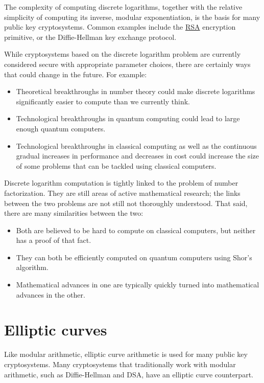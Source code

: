 \documentclass[11pt,ebook,table,dvipsnames]{memoir}
\begin{document}
The complexity of computing discrete logarithms, together with the
relative simplicity of computing its inverse, modular exponentiation,
is the basis for many public key cryptosystems. Common examples
include the \hyperref[RSA]{RSA} encryption primitive, or the Diffie-Hellman key
exchange protocol.

While cryptosystems based on the discrete logarithm problem are
currently considered secure with appropriate parameter choices, there
are certainly ways that could change in the future. For example:

\begin{itemize}
\item Theoretical breakthroughs in number theory could make discrete logarithms
significantly easier to compute than we currently think.
\item Technological breakthroughs in quantum computing could lead to large
enough quantum computers.
\item Technological breakthroughs in classical computing as well as the
continuous gradual increases in performance and decreases in cost
could increase the size of some problems that can be tackled using
classical computers.
\end{itemize}

Discrete logarithm computation is tightly linked to the problem of
number factorization. They are still areas of active mathematical
research; the links between the two problems are not still not
thoroughly understood. That said, there are many similarities between
the two:

\begin{itemize}
\item Both are believed to be hard to compute on classical computers, but
neither has a proof of that fact.
\item They can both be efficiently computed on quantum computers using
Shor's algorithm.
\item Mathematical advances in one are typically quickly turned into
mathematical advances in the other.
\end{itemize}
\chapter{Elliptic curves\label{Elliptic-curves}}
\label{sec-4-2}

Like modular arithmetic, elliptic curve arithmetic is used for many
public key cryptosystems. Many cryptosystems that traditionally work
with modular arithmetic, such as Diffie-Hellman and DSA, have an
elliptic curve counterpart.
\end{document}
